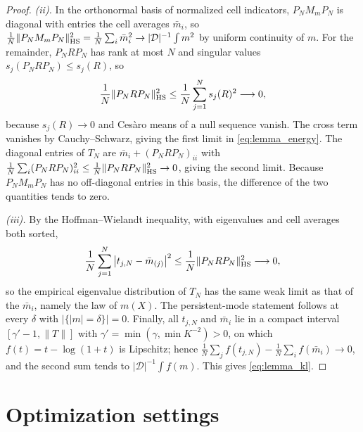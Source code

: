 \documentclass[11pt]{article}
\numberwithin{table}{section}
\numberwithin{figure}{section}
\begin{document}
\begin{proof}
\emph{(ii).} In the orthonormal basis of normalized cell indicators, $P_NM_mP_N$ is diagonal with entries the cell averages $\bar m_i$, so $\frac1N\|P_NM_mP_N\|_{\rm HS}^2=\frac1N\sum_i\bar m_i^2\to|\mathcal D|^{-1}\int m^2$ by uniform continuity of $m$. For the remainder, $P_NRP_N$ has rank at most $N$ and singular values $s_j(P_NRP_N)\le s_j(R)$, so
\begin{equation}
    \frac1N\|P_NRP_N\|_{\rm HS}^2\le\frac1N\sum_{j=1}^{N}s_j(R)^2\longrightarrow0,
\end{equation}
because $s_j(R)\to0$ and Ces\`aro means of a null sequence vanish. The cross term vanishes by Cauchy--Schwarz, giving the first limit in \eqref{eq:lemma_energy}. The diagonal entries of $T_N$ are $\bar m_i+(P_NRP_N)_{ii}$ with $\frac1N\sum_i(P_NRP_N)_{ii}^2\le\frac1N\|P_NRP_N\|_{\rm HS}^2\to0$, giving the second limit. Because $P_NM_mP_N$ has no off-diagonal entries in this basis, the difference of the two quantities tends to zero.

\emph{(iii).} By the Hoffman--Wielandt inequality, with eigenvalues and cell averages both sorted,
\begin{equation}
    \frac1N\sum_{j=1}^{N}\big|t_{j,N}-\bar m_{(j)}\big|^2\le\frac1N\|P_NRP_N\|_{\rm HS}^2\longrightarrow0,
\end{equation}
so the empirical eigenvalue distribution of $T_N$ has the same weak limit as that of the $\bar m_i$, namely the law of $m(X)$. The persistent-mode statement follows at every $\delta$ with $|\{|m|=\delta\}|=0$. Finally, all $t_{j,N}$ and $\bar m_i$ lie in a compact interval $[\gamma'-1,\|T\|]$ with $\gamma'=\min(\gamma,\min K^{-2})>0$, on which $f(t)=t-\log(1+t)$ is Lipschitz; hence $\frac1N\sum_jf(t_{j,N})-\frac1N\sum_if(\bar m_i)\to0$, and the second sum tends to $|\mathcal D|^{-1}\int f(m)$. This gives \eqref{eq:lemma_kl}.
\end{proof}

\section{Optimization settings}
\label{app:optimization}
\end{document}
